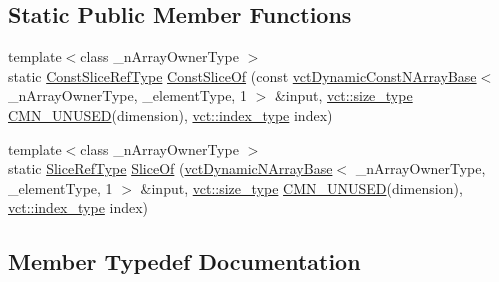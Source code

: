 \subsection*{Static Public Member Functions}
\begin{DoxyCompactItemize}
\item 
{\footnotesize template$<$class \+\_\+n\+Array\+Owner\+Type $>$ }\\static \hyperlink{classvct_dynamic_n_array_types_3_011_01_4_1_1_slices_types_a18f8addeaaa816d30b9ed8a7e7dd8f77}{Const\+Slice\+Ref\+Type} \hyperlink{classvct_dynamic_n_array_types_3_011_01_4_1_1_slices_types_a80679736dbde9c53af54d1f1de7c88ac}{Const\+Slice\+Of} (const \hyperlink{classvct_dynamic_const_n_array_base}{vct\+Dynamic\+Const\+N\+Array\+Base}$<$ \+\_\+n\+Array\+Owner\+Type, \+\_\+element\+Type, 1 $>$ \&input, \hyperlink{namespacevct_a3e2935e13aac4500965e00d30565775b}{vct\+::size\+\_\+type} \hyperlink{cmn_portability_8h_a021894e2626935fa2305434b1e893ff6}{C\+M\+N\+\_\+\+U\+N\+U\+S\+E\+D}(dimension), \hyperlink{namespacevct_a50405d87494dce1f22ee3930ca285ee9}{vct\+::index\+\_\+type} index)
\item 
{\footnotesize template$<$class \+\_\+n\+Array\+Owner\+Type $>$ }\\static \hyperlink{classvct_dynamic_n_array_types_3_011_01_4_1_1_slices_types_a34c9917853ea79e85ef0924a9a56a60f}{Slice\+Ref\+Type} \hyperlink{classvct_dynamic_n_array_types_3_011_01_4_1_1_slices_types_ac637db3f80235a25761d4a58663b0f8b}{Slice\+Of} (\hyperlink{classvct_dynamic_n_array_base}{vct\+Dynamic\+N\+Array\+Base}$<$ \+\_\+n\+Array\+Owner\+Type, \+\_\+element\+Type, 1 $>$ \&input, \hyperlink{namespacevct_a3e2935e13aac4500965e00d30565775b}{vct\+::size\+\_\+type} \hyperlink{cmn_portability_8h_a021894e2626935fa2305434b1e893ff6}{C\+M\+N\+\_\+\+U\+N\+U\+S\+E\+D}(dimension), \hyperlink{namespacevct_a50405d87494dce1f22ee3930ca285ee9}{vct\+::index\+\_\+type} index)
\end{DoxyCompactItemize}


\subsection{Member Typedef Documentation}
\hypertarget{classvct_dynamic_n_array_types_3_011_01_4_1_1_slices_types_a18f8addeaaa816d30b9ed8a7e7dd8f77}{}

